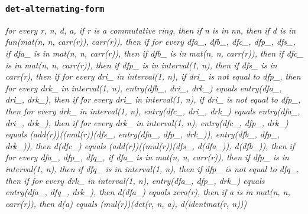 \documentclass[11pt]{article}
\begin{document}
\subsubsection*{\texttt{det-alternating-form}}
\emph{for every r, n, d, a, if r is a commutative ring, then if n is in nn, then if d is in fun(mat(n, n, carr(r)), carr(r)), then if for every dfa\_, dfb\_, dfc\_, dfp\_, dfs\_, if dfa\_ is in mat(n, n, carr(r)), then if dfb\_ is in mat(n, n, carr(r)), then if dfc\_ is in mat(n, n, carr(r)), then if dfp\_ is in interval(1, n), then if dfs\_ is in carr(r), then if for every dri\_ in interval(1, n), if dri\_ is not equal to dfp\_, then for every drk\_ in interval(1, n), entry(dfb\_, dri\_, drk\_) equals entry(dfa\_, dri\_, drk\_), then if for every dri\_ in interval(1, n), if dri\_ is not equal to dfp\_, then for every drk\_ in interval(1, n), entry(dfc\_, dri\_, drk\_) equals entry(dfa\_, dri\_, drk\_), then if for every drk\_ in interval(1, n), entry(dfc\_, dfp\_, drk\_) equals (add(r))((mul(r))(dfs\_, entry(dfa\_, dfp\_, drk\_)), entry(dfb\_, dfp\_, drk\_)), then d(dfc\_) equals (add(r))((mul(r))(dfs\_, d(dfa\_)), d(dfb\_)), then if for every dfa\_, dfp\_, dfq\_, if dfa\_ is in mat(n, n, carr(r)), then if dfp\_ is in interval(1, n), then if dfq\_ is in interval(1, n), then if dfp\_ is not equal to dfq\_, then if for every drk\_ in interval(1, n), entry(dfa\_, dfp\_, drk\_) equals entry(dfa\_, dfq\_, drk\_), then d(dfa\_) equals zero(r), then if a is in mat(n, n, carr(r)), then d(a) equals (mul(r))(det(r, n, a), d(identmat(r, n)))}
\end{document}
